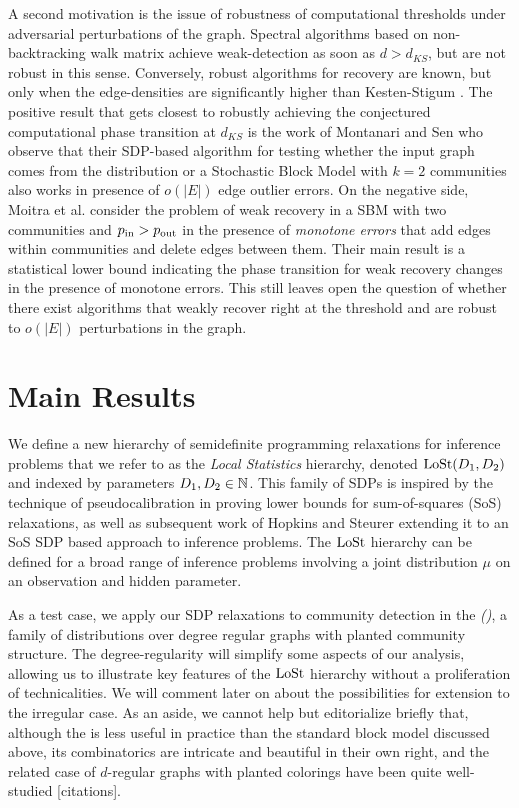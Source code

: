 A second motivation is the issue of robustness of computational thresholds under adversarial perturbations of the graph. Spectral algorithms based on non-backtracking walk matrix \cite{bordenave2015non} achieve weak-detection as soon as $d> d_{KS}$, but are not robust in this sense. Conversely, robust algorithms for recovery are known, but only when the edge-densities are significantly higher than Kesten-Stigum \cite{guedon2016community,makarychev2016learning,CharikarSV17,SteinhardtVC16}. The positive result that gets closest to robustly achieving the conjectured computational phase transition at $d_{KS}$ is the work of Montanari and Sen \cite{montanari2015semidefinite} who observe that their SDP-based algorithm for testing whether the input graph comes from the \ER distribution or a Stochastic Block Model with $k = 2$ communities also works in presence of $o(|E|)$ edge outlier errors.  On the negative side, Moitra et al. \cite{moitra2012singly} consider the problem of weak recovery in a SBM with two communities and $p_{\textup{in}} > p_{\textup{out}}$ in the presence of {\it monotone errors} that add edges within communities and delete edges between them. Their main result is a statistical lower bound indicating the phase transition for weak recovery changes in the presence of monotone errors. This still leaves open the question of whether there exist algorithms that weakly recover right at the threshold and are robust to $o(|E|)$ perturbations in the graph. 

\section{Main Results} %
\label{sec:main_results}

We define a new hierarchy of semidefinite programming relaxations for inference problems that we refer to as the \emph{Local Statistics} hierarchy, denoted $\operatorname{LoSt}(D_1,D_2)$ and indexed by parameters $D_1,D_2 \in \mathbb{N}$. This family of SDPs is inspired by the technique of pseudocalibration in proving lower bounds for sum-of-squares (SoS) relaxations, as well as subsequent work of Hopkins and Steurer \cite{hopkins2017efficient} extending it to an SoS SDP based approach to inference problems. The $\operatorname{LoSt}$ hierarchy can be defined for a broad range of inference problems involving a joint distribution $\mu$ on an observation and hidden parameter.

As a test case, we apply our SDP relaxations to community detection in the \emph{\fullmodel (\model)}, a family of distributions over degree regular graphs with planted community structure. The degree-regularity will simplify some aspects of our analysis, allowing us to illustrate key features of the $\operatorname{LoSt}$ hierarchy without a proliferation of technicalities. We will comment later on about the possibilities for extension to the irregular case. As an aside, we cannot help but editorialize briefly that, although the \model is less useful in practice than the standard block model discussed above, its combinatorics are intricate and beautiful in their own right, and the related case of $d$-regular graphs with planted colorings have been quite well-studied [citations].

